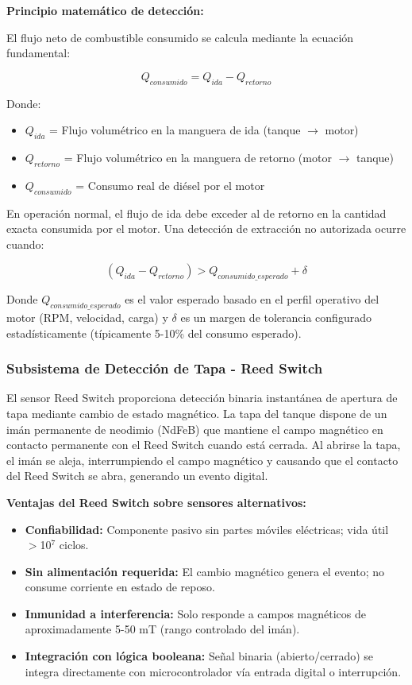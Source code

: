 \documentclass[twocolumn, 10pt]{article}
\begin{document}
\textbf{Principio matemático de detección:}

El flujo neto de combustible consumido se calcula mediante la ecuación fundamental:

\begin{equation}
Q_{consumido} = Q_{ida} - Q_{retorno}
\end{equation}

Donde:
\begin{itemize}
  \item $Q_{ida}$ = Flujo volumétrico en la manguera de ida (tanque $\rightarrow$ motor)
  \item $Q_{retorno}$ = Flujo volumétrico en la manguera de retorno (motor $\rightarrow$ tanque)
  \item $Q_{consumido}$ = Consumo real de diésel por el motor
\end{itemize}

En operación normal, el flujo de ida debe exceder al de retorno en la cantidad exacta consumida por el motor. Una detección de extracción no autorizada ocurre cuando:

\begin{equation}
(Q_{ida} - Q_{retorno}) > Q_{consumido\_esperado} + \delta
\end{equation}

Donde $Q_{consumido\_esperado}$ es el valor esperado basado en el perfil operativo del motor (RPM, velocidad, carga) y $\delta$ es un margen de tolerancia configurado estadísticamente (típicamente 5-10\% del consumo esperado).

\subsubsection*{Subsistema de Detección de Tapa - Reed Switch}

El sensor Reed Switch proporciona detección binaria instantánea de apertura de tapa mediante cambio de estado magnético. La tapa del tanque dispone de un imán permanente de neodimio (NdFeB) que mantiene el campo magnético en contacto permanente con el Reed Switch cuando está cerrada. Al abrirse la tapa, el imán se aleja, interrumpiendo el campo magnético y causando que el contacto del Reed Switch se abra, generando un evento digital.

\textbf{Ventajas del Reed Switch sobre sensores alternativos:}
\begin{itemize}
  \item \textbf{Confiabilidad:} Componente pasivo sin partes móviles eléctricas; vida útil $>$10$^{7}$ ciclos.
  \item \textbf{Sin alimentación requerida:} El cambio magnético genera el evento; no consume corriente en estado de reposo.
  \item \textbf{Inmunidad a interferencia:} Solo responde a campos magnéticos de aproximadamente 5-50 mT (rango controlado del imán).
  \item \textbf{Integración con lógica booleana:} Señal binaria (abierto/cerrado) se integra directamente con microcontrolador vía entrada digital o interrupción.
\end{itemize}
\end{document}
